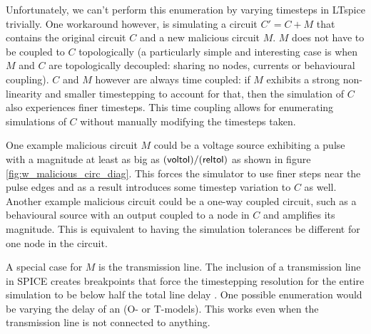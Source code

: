 Unfortunately, we can't perform this enumeration by varying timesteps in LTspice 
trivially. One workaround however, is simulating a circuit $C'=C+M$ that contains
the original circuit $C$ and a new malicious circuit $M$. $M$ does not have to be coupled
to $C$ topologically (a particularly simple and interesting case is when $M$ and $C$ are topologically
decoupled: sharing no nodes, 
currents or behavioural coupling).
$C$ and $M$ however are always time coupled: if $M$ exhibits a strong non-linearity
and smaller timestepping to account for that, then the simulation of $C$ also experiences 
finer timesteps. This time coupling allows
for enumerating simulations of $C$ without manually modifying the timesteps taken.

One example malicious circuit $M$ could be a voltage source exhibiting a pulse 
with a magnitude at least as big as $(\textnormal{\textsf{voltol}})/(\textnormal{\textsf{reltol}})$
as shown in figure \ref{fig:w_malicious_circ_diag}.
This forces the simulator to use finer steps near the pulse edges and as a result
introduces some timestep variation to $C$ as well. Another example malicious circuit 
could be a one-way coupled circuit, such as a behavioural source with an output coupled
to a node in $C$ and amplifies its magnitude. This is equivalent to having the simulation
tolerances be different for one node in the circuit.

A special case for $M$ is the transmission line. The inclusion of a transmission line
in SPICE creates breakpoints that force the timestepping resolution for the entire simulation
to be below half the total line delay \cite{hspice, spice-book}. One possible enumeration would
be varying the delay of an  (O- or T-models). This works even when the transmission line
is not connected to anything.

